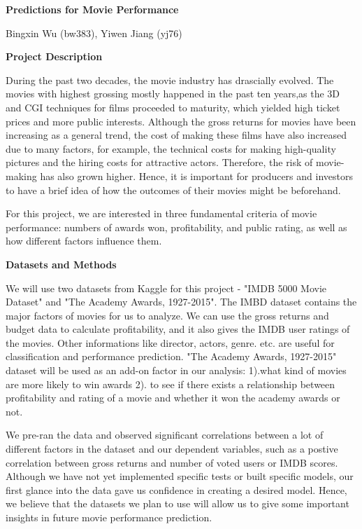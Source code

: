 \documentclass[12pt,a4paper]{article}
\begin{document}
\begin{center}
\huge\bfseries Predictions for Movie Performance\par
\bigskip
\large Bingxin Wu (bw383), Yiwen Jiang (yj76)
\end{center}

\bigskip
{\Large\bfseries Project Description \par}
\bigskip
During the past two decades, the movie industry has drascially evolved. The movies with highest grossing mostly happened in the past ten years,as the 3D and CGI techniques for films proceeded to maturity, which yielded high ticket prices and more public interests. Although the gross returns for movies have been increasing as a general trend, the cost of making these films have also increased due to many factors, for example, the technical costs for making high-quality pictures and the hiring costs for attractive actors. Therefore, the risk of movie-making has also grown higher. Hence, it is important for producers and investors to have a brief idea of how the outcomes of their movies might be beforehand. \par
For this project, we are interested in three fundamental criteria of movie performance: numbers of awards won, profitability, and public rating, as well as how different factors influence them.

\bigskip
{\Large\bfseries Datasets and Methods\par}
\bigskip
We will use two datasets from Kaggle for this project - "IMDB 5000 Movie Dataset" and "The Academy Awards, 1927-2015". The IMBD dataset contains the major factors of movies for us to analyze. We can use the gross returns and budget data to calculate profitability, and it also gives the IMDB user ratings of the movies. Other informations like director, actors, genre. etc. are useful for classification and performance prediction. "The Academy Awards, 1927-2015" dataset will be used as an add-on factor in our analysis: 1).what kind of movies are more likely to win awards  2). to see if there exists a relationship between profitability and rating of a movie and whether it won the academy awards or not. \par
We pre-ran the data and observed significant correlations between a lot of different factors in the dataset and our dependent variables, such as a postive correlation between gross returns and number of voted users or IMDB scores. Although we have not yet implemented specific tests or built specific models, our first glance into the data gave us confidence in creating a desired model. Hence, we believe that the datasets we plan to use will allow us to give some important insights in future movie performance prediction. 
\end{document}
